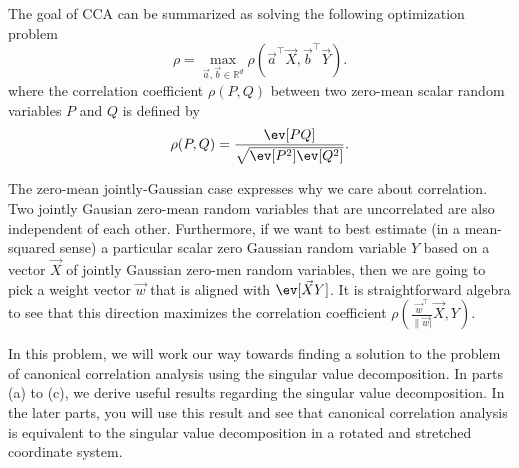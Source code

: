 \documentclass[preview]{standalone}
\begin{document}
The goal of CCA can be summarized as solving the following optimization problem
\begin{equation}
\rho = \max_{\vec{a}, \vec{b} \in \mathbb{R}^d} \rho(\vec{a}^\top \vec X, \vec{b}^\top \vec Y).
\end{equation}
where  the correlation coefficient $\rho(P, Q)$ between two zero-mean scalar random variables $P$ and $Q$
is defined by
\begin{align*}
  \rho(P, Q) = \frac{\ev [PQ]}{\sqrt{\ev[P^2] \ev[Q^2]}}.
\end{align*}

The zero-mean jointly-Gaussian case expresses why we care about
correlation. Two jointly Gausian zero-mean random variables that are
uncorrelated are also independent of each other. Furthermore, if we
want to best estimate (in a mean-squared sense) a particular scalar
zero Gaussian random variable $Y$ based on a vector $\vec X$ of
jointly Gaussian zero-men random variables, then we are going to pick
a weight vector $\vec{w}$ that is aligned with $\ev[\vec X Y]$. It is
straightforward algebra to see that this direction maximizes the
correlation coefficient $\rho (\frac{\vec{w}^{\top}}{\| \vec w |} \vec X, Y)$.


In this problem, we will work our way towards
finding a solution to the problem of canonical correlation analysis using the singular value decomposition.
In parts (a) to (c), we derive useful results regarding the singular
value decomposition.
In the later parts, you will use this result and see that
canonical correlation analysis is equivalent to the singular value decomposition
in a rotated and stretched coordinate system.
\end{document}
